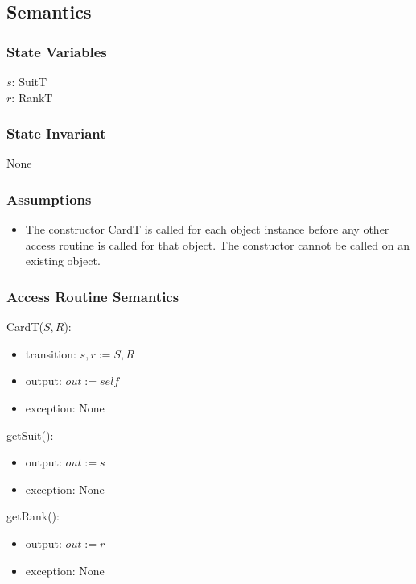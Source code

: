 \documentclass[12pt]{article}
\begin{document}
\subsection*{Semantics}

\subsubsection*{State Variables}

$s$: SuitT\\
$r$: RankT\\

\subsubsection*{State Invariant}

None

\subsubsection*{Assumptions}

\begin{itemize}
    \item The constructor CardT is called for
    each object instance before any other access routine is called
    for that object. The constuctor cannot be called on an existing
    object.
\end{itemize}

\subsubsection*{Access Routine Semantics}

CardT($S,R$):
\begin{itemize}
    \item transition: $s, r := S, R$
    \item output: $out := \mathit{self}$
    \item exception: None
\end{itemize}

\noindent getSuit():
\begin{itemize}
    \item output: $out := s$
    \item exception: None
\end{itemize}

\noindent getRank():
\begin{itemize}
    \item output: $out := r$
    \item exception: None
\end{itemize}
\end{document}
